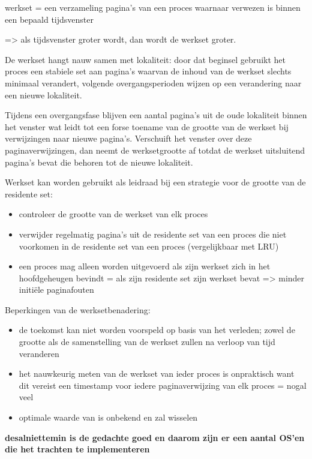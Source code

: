 werkset = een verzameling pagina's van een proces waarnaar verwezen is binnen een bepaald tijdsvenster

=> als tijdsvenster groter wordt, dan wordt de werkset groter.

De werkset hangt nauw samen met lokaliteit: door dat beginsel gebruikt het proces een stabiele set aan pagina's waarvan de inhoud van de werkset slechts minimaal verandert, volgende overgangsperioden wijzen op een verandering naar een nieuwe lokaliteit.


Tijdens een overgangsfase blijven een aantal pagina's uit de oude lokaliteit binnen het venster wat leidt tot een forse toename van de grootte van de werkset bij verwijzingen naar nieuwe pagina's. Verschuift het venster over deze paginaverwijzingen, dan neemt de werksetgrootte af totdat de werkset uitsluitend pagina's bevat die behoren tot de nieuwe lokaliteit.

Werkset kan worden gebruikt als leidraad bij een strategie voor de grootte van de residente set:

\begin{itemize}
\item controleer de grootte van de werkset van elk proces
\item verwijder regelmatig pagina's uit de residente set van een proces die niet voorkomen in de residente set van een proces (vergelijkbaar met LRU)
\item een proces mag alleen worden uitgevoerd als zijn werkset zich in het hoofdgeheugen bevindt = als zijn residente set zijn werkset bevat => minder initiële paginafouten
\end{itemize}

Beperkingen van de werksetbenadering:

\begin{itemize}
\item de toekomst kan niet worden voorspeld op basis van het verleden; zowel de grootte als de samenstelling van de werkset zullen na verloop van tijd veranderen
\item het nauwkeurig meten van de werkset van ieder proces is onpraktisch want dit vereist een timestamp voor iedere paginaverwijzing van elk proces = nogal veel
\item optimale waarde van is onbekend en zal wisselen
\end{itemize}

\textbf{desalniettemin is de gedachte goed en daarom zijn er een aantal OS'en die het trachten te implementeren}

